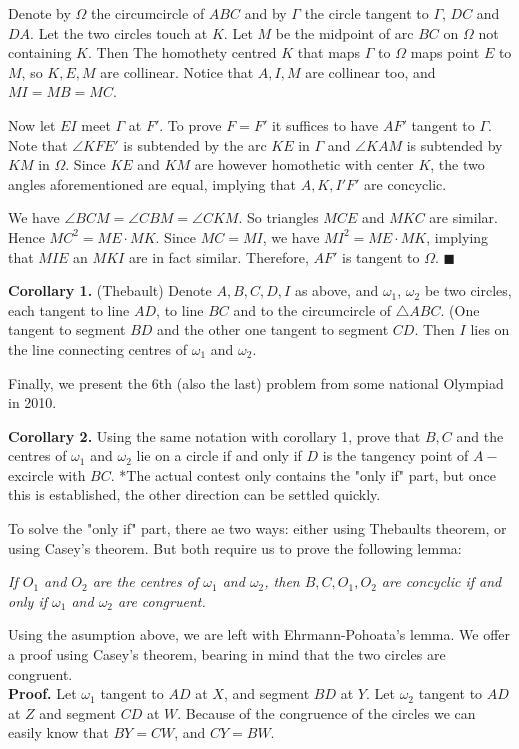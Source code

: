 \documentclass[11pt,a4paper]{article}
\begin{document}
 Denote by $\Omega$ the circumcircle of $ABC$ and by $\Gamma$ the circle tangent to $\Gamma$, $DC$ and $DA$. Let the two circles touch at $K$. Let $M$ be the midpoint of arc $BC$ on $\Omega$ not containing $K$. Then The homothety centred $K$ that maps $\Gamma$ to $\Omega$ maps point $E$ to $M$, so $K,E,M$ are collinear. Notice that $A,I,M$ are collinear too, and $MI=MB=MC$.

Now let $EI$ meet $\Gamma$ at $F'$. To prove $F=F'$ it suffices to have $AF'$ tangent to $\Gamma$. Note that $\angle KFE'$ is subtended by the arc $KE$ in $\Gamma$ and $\angle KAM$ is subtended by $KM$ in $\Omega$. Since $KE$ and $KM$ are however homothetic with center $K$, the two angles aforementioned are equal, implying that $A,K,I'F'$ are concyclic.

We have $\angle BCM=\angle CBM=\angle CKM$. So triangles $MCE$ and $MKC$ are similar. Hence $MC^{2}=ME\cdot MK$. Since $MC=MI$, we have $MI^{2}=ME\cdot MK$, implying that $MIE$ an $MKI$ are in fact similar. Therefore, $AF'$ is tangent to $\Omega$. $\blacksquare$

\textbf {Corollary 1.} (Thebault) Denote $A,B,C,D,I$ as above, and $\omega_1$, $\omega_2$ be two circles, each tangent to line $AD$, to line $BC$ and to the circumcircle of $\triangle ABC$. (One tangent to segment $BD$ and the other one tangent to segment $CD$. Then $I$ lies on the line connecting centres of $\omega_1$ and $\omega_2$.

Finally, we present the 6th (also the last) problem from some national Olympiad in 2010.

\textbf {Corollary 2.} Using the same notation with corollary 1, prove that $B, C$ and the centres of $\omega_1$ and $\omega_2$ lie on a circle if and only if $D$ is the tangency point of $A-$excircle with $BC$. *The actual contest only contains the "only if" part, but once this is established, the other direction can be settled quickly.

To solve the "only if" part, there ae two ways: either using Thebaults theorem, or using Casey's theorem. But both require us to prove the following lemma: 

\emph {If $O_1$ and $O_2$  are the centres of  $\omega_1$ and $\omega_2$, then $B, C, O_1, O_2$ are concyclic if and only if $\omega_1$ and $\omega_2$ are congruent.}

Using the asumption above, we are left with Ehrmann-Pohoata's lemma. We offer a proof using Casey's theorem, bearing in mind that the two circles are congruent.\\
\textbf{Proof.} Let $\omega_1$ tangent to $AD$ at $X$, and segment $BD$ at $Y$. Let $\omega_2$ tangent to $AD$ at $Z$ and segment $CD$ at $W$. Because of the congruence of the circles we can easily know that $BY=CW$, and $CY=BW$.
\end{document}

